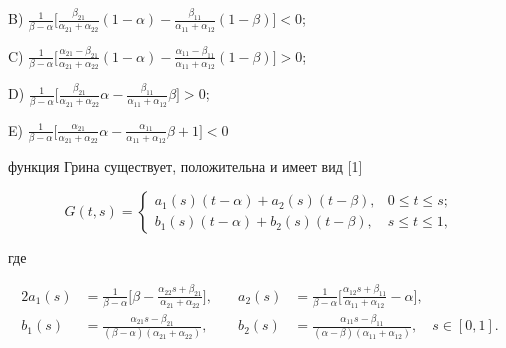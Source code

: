 B) $\frac{1}{\beta-\alpha}\big[ \frac{\beta_{21}}{\alpha_{21}+\alpha_{22}} 


(1-\alpha)-\frac{\beta_{11}} {\alpha_{11}+\alpha_{12}}(1-\beta)\big]<0$; 


 


C) $\frac{1}{\beta-\alpha}\big[ 


\frac{\alpha_{21}-\beta_{21}}{\alpha_{21}+\alpha_{22}} 


(1-\alpha)-\frac{\alpha_{11}-\beta_{11}} 


{\alpha_{11}+\alpha_{12}}(1-\beta)\big]>0$; 


 


D) $\frac{1}{\beta-\alpha}\big[ \frac{\beta_{21}}{\alpha_{21}+\alpha_{22}} 


\alpha-\frac{\beta_{11}} {\alpha_{11}+\alpha_{12}}\beta\big]>0$; 


 


E) $\frac{1}{\beta-\alpha}\big[ 


\frac{\alpha_{21}}{\alpha_{21}+\alpha_{22}}\alpha-\frac{\alpha_{11}} 


{\alpha_{11}+\alpha_{12}}\beta+1\big]<0$ 


 


\noindent{}функция Грина существует, положительна и имеет вид [1] 


$$ 


G(t,s)= 


\begin{cases} 


a_1(s)(t-\alpha)+a_2(s)(t-\beta), & 0\le t\le s;\\ 


b_1(s)(t-\alpha)+b_2(s)(t-\beta), & s\le t\le 1, 


\end{cases} 


$$ 


где 


\begin{alignat*}{2} 


a_1(s)&=\frac{1}{\beta-\alpha}\bigg[\beta- 


\frac{\alpha_{22}s+\beta_{21}}{\alpha_{21}+\alpha_{22}}\bigg], 


&\quad a_2(s)&=\frac{1}{\beta-\alpha}\bigg[ 


\frac{\alpha_{12}s+\beta_{11}}{\alpha_{11}+\alpha_{12}}-\alpha 


\bigg],\\ 


% 


b_1(s)&=\frac{\alpha_{21}s-\beta_{21}} 


{(\beta-\alpha)(\alpha_{21}+\alpha_{22})}, &\quad 


b_2(s)&=\frac{\alpha_{11}s-\beta_{11}} 


{(\alpha-\beta)(\alpha_{11}+\alpha_{12})}, \quad s\in[0,1]. 


\end{alignat*} 


